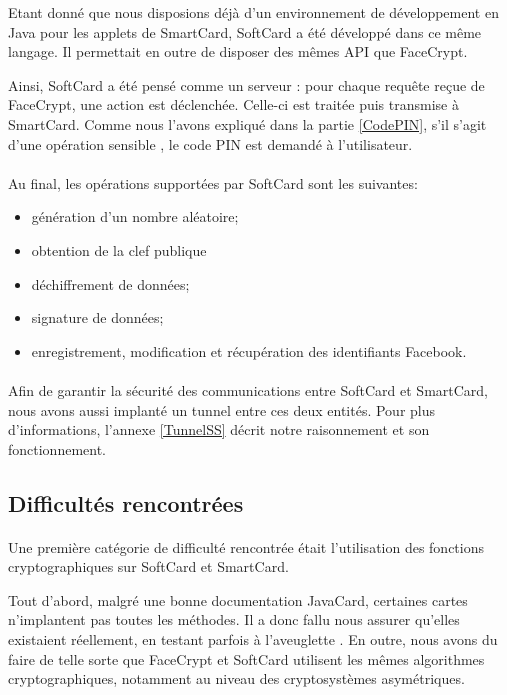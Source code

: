 \documentclass[a4paper,11pt,french]{article}
\begin{document}
Etant donné que nous disposions déjà d'un environnement de développement en Java
pour les applets de SmartCard, SoftCard a été développé dans ce même langage. Il
permettait en outre de disposer des mêmes API que FaceCrypt.

Ainsi, SoftCard a été pensé comme un serveur : pour chaque requête reçue de 
FaceCrypt, une action est déclenchée. Celle-ci est traitée puis transmise à
SmartCard. Comme nous l'avons expliqué dans la partie \ref{CodePIN}, s'il s'agit
d'une opération \og sensible \fg, le code PIN est demandé à l'utilisateur.

\paragraph{}
Au final, les opérations supportées par SoftCard sont les suivantes:  
\begin{itemize}
    \item génération d'un nombre aléatoire;
    \item obtention de la clef publique
    \item déchiffrement de données;
    \item signature de données;
    \item enregistrement, modification et récupération des identifiants Facebook.
\end{itemize}

\paragraph{}
Afin de garantir la sécurité des communications entre SoftCard et SmartCard,
nous avons aussi implanté un tunnel entre ces deux entités. Pour plus 
d'informations, l'annexe \ref{TunnelSS} décrit notre raisonnement et son
fonctionnement.

\subsection{Difficultés rencontrées}
\paragraph{}
Une première catégorie de difficulté rencontrée était l'utilisation des fonctions
cryptographiques sur SoftCard et SmartCard.

Tout d'abord, malgré une bonne documentation JavaCard, certaines cartes 
n'implantent pas toutes les méthodes. Il a donc fallu nous assurer 
qu'elles existaient réellement, en testant parfois \og à l'aveuglette 
\fg{}. En outre, nous avons du faire de telle sorte que FaceCrypt et SoftCard 
utilisent les mêmes algorithmes cryptographiques, notamment au niveau des 
cryptosystèmes asymétriques.
\end{document}

